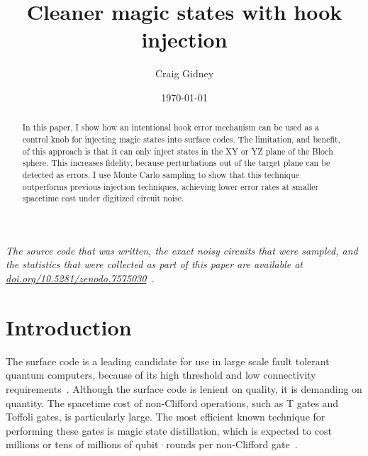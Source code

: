 \documentclass[onecolumn,unpublished,a4paper]{quantumarticle}
\theoremstyle{definition}
\theoremstyle{definition}
\theoremstyle{definition}
\begin{document}
\title{Cleaner magic states with hook injection}

\date{\today}
\author{Craig Gidney}

\begin{abstract}
In this paper, I show how an intentional hook error mechanism can be used as a control knob for injecting magic states into surface codes.
The limitation, and benefit, of this approach is that it can only inject states in the XY or YZ plane of the Bloch sphere.
This increases fidelity, because perturbations out of the target plane can be detected as errors.
I use Monte Carlo sampling to show that this technique outperforms previous injection techniques, achieving lower error rates at smaller spacetime cost under digitized circuit noise.
\end{abstract}

\emph{The source code that was written, the exact noisy circuits that were sampled, and the statistics that were collected as part of this paper are available at \href{https://doi.org/10.5281/zenodo.7575030}{doi.org/10.5281/zenodo.7575030}~\cite{gidneyhookdata2023}.}

\maketitle

\section{Introduction}
\label{sec:introduction}

The surface code is a leading candidate for use in large scale fault tolerant quantum computers, because of its high threshold and low connectivity requirements~\cite{fowler2012surfacecodereview}.
Although the surface code is lenient on quality, it is demanding on quantity.
The spacetime cost of non-Clifford operations, such as T gates and Toffoli gates, is particularly large.
The most efficient known technique for performing these gates is magic state distillation, which is expected to cost millions or tens of millions of qubit·rounds per non-Clifford gate~\cite{litinski2019lesscostly,gidney2019catalyzeddistillation,fowler2018latticesurgery}.
\end{document}
